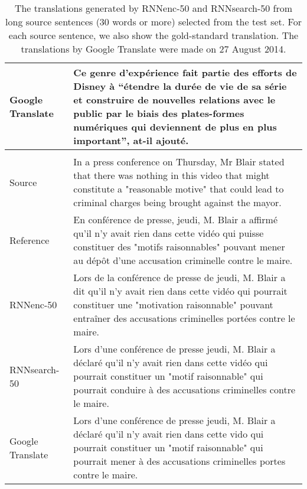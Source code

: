 \begin{table}[htp]
\begin{minipage}{0.99\textwidth}
\begin{tabular}{p{1.9cm} | p{12cm}}
\\
\hline Google \mbox{Translate} & Ce genre d'exp\'erience fait partie des efforts de Disney
à ``\'etendre la dur\'ee de vie de sa s\'erie et construire de nouvelles relations avec
le public par le biais des plates-formes num\'eriques qui deviennent de plus en
plus important'', at-il ajout\'e.
\\
\hline
\multicolumn{2}{c}{} \\
\hline Source & 
In a press conference on Thursday, Mr Blair stated that there was nothing in
this video that might constitute a "reasonable motive" that could lead to
criminal charges being brought against the mayor.
\\
\hline Reference & En conf\'erence de presse, jeudi, M. Blair a affirm\'e qu'il n'y avait rien dans cette vid\'eo qui puisse constituer des "motifs raisonnables" pouvant mener au d\'ep\^ot d'une accusation criminelle contre le maire.
\\
\hline RNNenc-50 & Lors de la conf\'erence de presse de jeudi, M. Blair a dit qu'il n'y avait rien dans cette vid\'eo qui pourrait constituer une "motivation raisonnable" pouvant entraîner des accusations criminelles port\'ees contre le maire.
\\
\hline RNNsearch-50 & Lors d'une conf\'erence de presse jeudi, M. Blair a d\'eclar\'e qu'il n'y avait rien dans cette vid\'eo qui pourrait constituer un "motif raisonnable" qui pourrait conduire à des accusations criminelles contre le maire.
\\
\hline Google \mbox{Translate} & 
Lors d'une conf\'erence de presse jeudi, M. Blair a d\'eclar\'e qu'il n'y avait rien
dans cette vido qui pourrait constituer un "motif raisonnable" qui pourrait
mener à des accusations criminelles portes contre le maire.
\\
\hline
        \end{tabular}
    \end{minipage}
    \caption{The translations generated by RNNenc-50 and RNNsearch-50 from long
        source sentences (30 words or more) selected from the test set. For each
        source sentence, we also show the gold-standard translation.  The
        translations by Google Translate were made on 27 August 2014.
}

\label{tab:translations}
\end{table}
